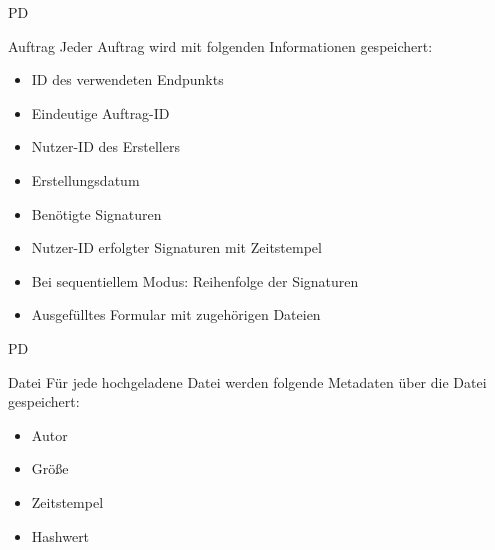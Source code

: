 \begin{Kriterien}{PD}
\item[\gls{Auftrag}] Jeder Auftrag wird mit folgenden Informationen gespeichert:
\end{Kriterien}
\vspace{-10pt}
\begin{itemize}\itemsep-10pt
\item ID des verwendeten Endpunkts
\item Eindeutige Auftrag-ID
\item Nutzer-ID des Erstellers
\item Erstellungsdatum
\item Benötigte Signaturen
\item Nutzer-ID erfolgter Signaturen mit Zeitstempel
\item Bei sequentiellem Modus: Reihenfolge der Signaturen
\item Ausgefülltes Formular mit zugehörigen Dateien
\end{itemize}

\begin{Kriterien}{PD}
\item[Datei] Für jede hochgeladene Datei werden folgende Metadaten über die Datei gespeichert:
\end{Kriterien}
\vspace{-10pt}
\begin{itemize}\itemsep-10pt
\item Autor
\item Größe
\item Zeitstempel
\item Hashwert
\end{itemize}
